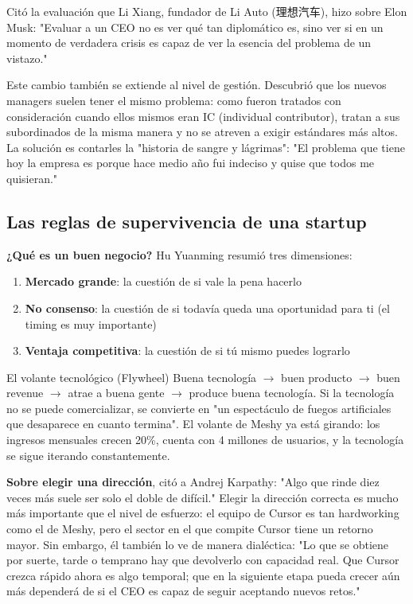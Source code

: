 \documentclass[a4paper]{article}
\begin{document}
Citó la evaluación que Li Xiang, fundador de Li Auto (理想汽车), hizo sobre Elon Musk: "Evaluar a un CEO no es ver qué tan diplomático es, sino ver si en un momento de verdadera crisis es capaz de ver la esencia del problema de un vistazo."

Este cambio también se extiende al nivel de gestión. Descubrió que los nuevos managers suelen tener el mismo problema: como fueron tratados con consideración cuando ellos mismos eran IC (individual contributor), tratan a sus subordinados de la misma manera y no se atreven a exigir estándares más altos. La solución es contarles la "historia de sangre y lágrimas": "El problema que tiene hoy la empresa es porque hace medio año fui indeciso y quise que todos me quisieran."

\subsection{Las reglas de supervivencia de una startup}

\textbf{¿Qué es un buen negocio?} Hu Yuanming resumió tres dimensiones:
\begin{enumerate}
\item \textbf{Mercado grande}: la cuestión de si vale la pena hacerlo
\item \textbf{No consenso}: la cuestión de si todavía queda una oportunidad para ti (el timing es muy importante)
\item \textbf{Ventaja competitiva}: la cuestión de si tú mismo puedes lograrlo
\end{enumerate}

\begin{importantbox}{El volante tecnológico (Flywheel)}
Buena tecnología $\rightarrow$ buen producto $\rightarrow$ buen revenue $\rightarrow$ atrae a buena gente $\rightarrow$ produce buena tecnología. Si la tecnología no se puede comercializar, se convierte en "un espectáculo de fuegos artificiales que desaparece en cuanto termina". El volante de Meshy ya está girando: los ingresos mensuales crecen 20\%, cuenta con 4 millones de usuarios, y la tecnología se sigue iterando constantemente.
\end{importantbox}

\textbf{Sobre elegir una dirección}, citó a Andrej Karpathy: "Algo que rinde diez veces más suele ser solo el doble de difícil." Elegir la dirección correcta es mucho más importante que el nivel de esfuerzo: el equipo de Cursor es tan hardworking como el de Meshy, pero el sector en el que compite Cursor tiene un retorno mayor. Sin embargo, él también lo ve de manera dialéctica: "Lo que se obtiene por suerte, tarde o temprano hay que devolverlo con capacidad real. Que Cursor crezca rápido ahora es algo temporal; que en la siguiente etapa pueda crecer aún más dependerá de si el CEO es capaz de seguir aceptando nuevos retos."
\end{document}

